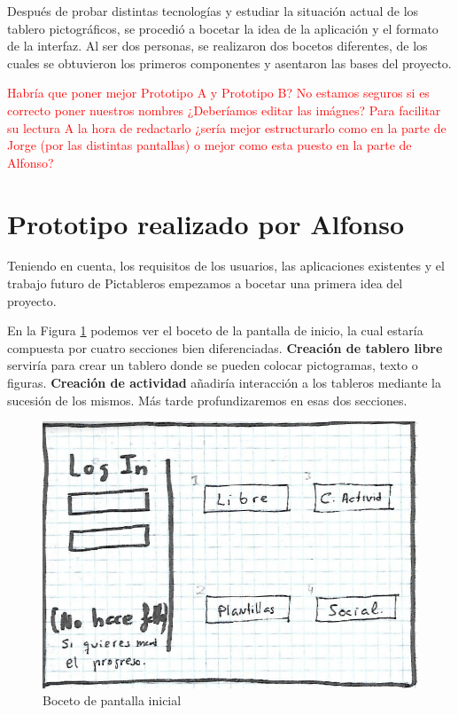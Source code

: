 Después de probar distintas tecnologías y estudiar la situación actual de los tablero pictográficos, se procedió a bocetar la idea de la aplicación y el formato de la interfaz. Al ser dos personas, se realizaron dos bocetos diferentes, de los cuales se obtuvieron los primeros componentes y asentaron las bases del proyecto.

\textcolor{red}{Habría que poner mejor Prototipo A y Prototipo B? No estamos  seguros si es correcto poner nuestros nombres}
\textcolor{red}{¿Deberíamos editar las imágnes? Para facilitar su lectura}
\textcolor{red}{A la hora de redactarlo ¿sería mejor estructurarlo como en la parte de Jorge (por las distintas pantallas) o mejor como esta puesto en la parte de Alfonso?}

\section*{Prototipo realizado por Alfonso}

Teniendo en cuenta, los requisitos de los usuarios, las aplicaciones existentes y el trabajo futuro de Pictableros empezamos a bocetar una primera idea del proyecto.


En la Figura \ref{fig:loginalfonso} podemos ver el boceto de la pantalla de  inicio, la cual estaría compuesta por cuatro secciones bien diferenciadas.\textbf{ Creación de tablero libre} serviría para crear un tablero donde se pueden colocar pictogramas, texto o figuras. \textbf{Creación de actividad} añadiría interacción a los tableros mediante la sucesión de los mismos. Más tarde profundizaremos en esas dos secciones.

\begin{figure}[h!]
	\centering
	\includegraphics[width=0.7\linewidth]{Imagenes/Bitmap/logInAlfonso}
	\caption{Boceto de pantalla inicial}
	\label{fig:loginalfonso}
\end{figure}

